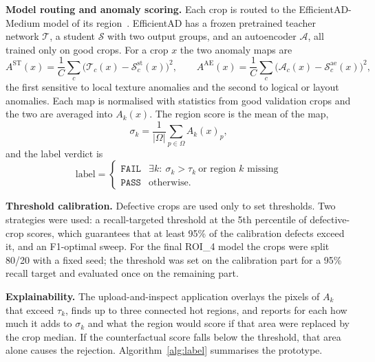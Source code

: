 \noindent\textbf{Model routing and anomaly scoring.} Each crop is routed to the EfficientAD-Medium model of its region~\cite{batzner2024}. EfficientAD has a frozen pretrained teacher network $\mathcal{T}$, a student $\mathcal{S}$ with two output groups, and an autoencoder $\mathcal{A}$, all trained only on good crops. For a crop $x$ the two anomaly maps are
\begin{equation}
    A^{\text{ST}}(x) = \frac{1}{C}\sum_{c}\big(\mathcal{T}_c(x)-\mathcal{S}^{\text{st}}_c(x)\big)^2,\qquad
    A^{\text{AE}}(x) = \frac{1}{C}\sum_{c}\big(\mathcal{A}_c(x)-\mathcal{S}^{\text{ae}}_c(x)\big)^2,
\end{equation}
the first sensitive to local texture anomalies and the second to logical or layout anomalies. Each map is normalised with statistics from good validation crops and the two are averaged into $A_k(x)$. The region score is the mean of the map,
\begin{equation}
    \sigma_k = \frac{1}{|\Omega|}\sum_{p\in\Omega} A_k(x)_p ,
    \label{eq:roiscore}
\end{equation}
and the label verdict is
\begin{equation}
    \text{label} = \begin{cases}
    \texttt{FAIL} & \exists k:\ \sigma_k>\tau_k \ \text{or region } k \text{ missing}\\
    \texttt{PASS} & \text{otherwise.}
    \end{cases}
    \label{eq:labelrule}
\end{equation}

\noindent\textbf{Threshold calibration.} Defective crops are used only to set thresholds. Two strategies were used: a recall-targeted threshold at the 5th percentile of defective-crop scores, which guarantees that at least 95\% of the calibration defects exceed it, and an F1-optimal sweep. For the final ROI\_4 model the crops were split 80/20 with a fixed seed; the threshold was set on the calibration part for a 95\% recall target and evaluated once on the remaining part.

\noindent\textbf{Explainability.} The upload-and-inspect application overlays the pixels of $A_k$ that exceed $\tau_k$, finds up to three connected hot regions, and reports for each how much it adds to $\sigma_k$ and what the region would score if that area were replaced by the crop median. If the counterfactual score falls below the threshold, that area alone causes the rejection. Algorithm~\ref{alg:label} summarises the prototype.

